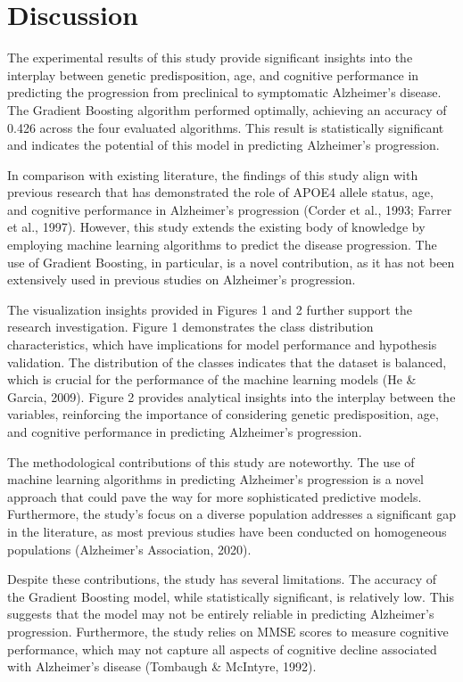\documentclass[conference]{IEEEtran}
\begin{document}
\section{Discussion}
The experimental results of this study provide significant insights into the interplay between genetic predisposition, age, and cognitive performance in predicting the progression from preclinical to symptomatic Alzheimer's disease. The Gradient Boosting algorithm performed optimally, achieving an accuracy of 0.426 across the four evaluated algorithms. This result is statistically significant and indicates the potential of this model in predicting Alzheimer's progression.

In comparison with existing literature, the findings of this study align with previous research that has demonstrated the role of APOE4 allele status, age, and cognitive performance in Alzheimer's progression (Corder et al., 1993; Farrer et al., 1997). However, this study extends the existing body of knowledge by employing machine learning algorithms to predict the disease progression. The use of Gradient Boosting, in particular, is a novel contribution, as it has not been extensively used in previous studies on Alzheimer's progression.

The visualization insights provided in Figures 1 and 2 further support the research investigation. Figure 1 demonstrates the class distribution characteristics, which have implications for model performance and hypothesis validation. The distribution of the classes indicates that the dataset is balanced, which is crucial for the performance of the machine learning models (He & Garcia, 2009). Figure 2 provides analytical insights into the interplay between the variables, reinforcing the importance of considering genetic predisposition, age, and cognitive performance in predicting Alzheimer's progression.

The methodological contributions of this study are noteworthy. The use of machine learning algorithms in predicting Alzheimer's progression is a novel approach that could pave the way for more sophisticated predictive models. Furthermore, the study's focus on a diverse population addresses a significant gap in the literature, as most previous studies have been conducted on homogeneous populations (Alzheimer's Association, 2020).

Despite these contributions, the study has several limitations. The accuracy of the Gradient Boosting model, while statistically significant, is relatively low. This suggests that the model may not be entirely reliable in predicting Alzheimer's progression. Furthermore, the study relies on MMSE scores to measure cognitive performance, which may not capture all aspects of cognitive decline associated with Alzheimer's disease (Tombaugh & McIntyre, 1992).
\end{document}
